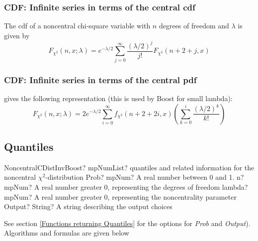 \subsubsection{CDF: Infinite series in terms of the central cdf}
The cdf of a noncentral chi-square variable with $n$ degrees of freedom and $\lambda$ is given by
\begin{equation}
	F_{\chi^2}\left(n, x; \lambda\right) = e^{-\lambda/2} \sum_{j=0}^\infty {\frac{(\lambda /2)^j}{j!} F_{\chi^2}\left(n+2+j, x\right) }
\end{equation} 

\subsubsection{CDF: Infinite series in terms of the central pdf}
\cite{ding_1992} gives the following representation (this is used by Boost for small lambda):
\begin{equation}
	F_{\chi^2}\left(n, x; \lambda\right) = 2e^{-\lambda/2} \sum_{i=0}^\infty f_{\chi^2}\left(n+2+2i, x\right) \left(\sum_{k=0}^i{\frac{(\lambda /2)^k}{k!}}\right)
\end{equation} 





\subsection{Quantiles}
\label{NoncentralChiSquareDistributionQuantilesBoost}

\begin{mpFunctionsExtract}
	\mpFunctionFour
	{NoncentralCDistInvBoost? mpNumList? quantiles and related information for the noncentral $\chi^2$-distribution}
	{Prob? mpNum? A real number between 0 and 1.}
	{n? mpNum? A real number greater 0, representing the degrees of freedom}
	{lambda? mpNum? A real number greater 0, representing the noncentrality parameter}
	{Output? String? A string describing the output choices}
\end{mpFunctionsExtract}

\vspace{0.3cm}
See section \ref{Functions returning Quantiles} for the options for  {\itshape\sffamily Prob} and {\itshape\sffamily Output}). Algorithms and formulas are given below


